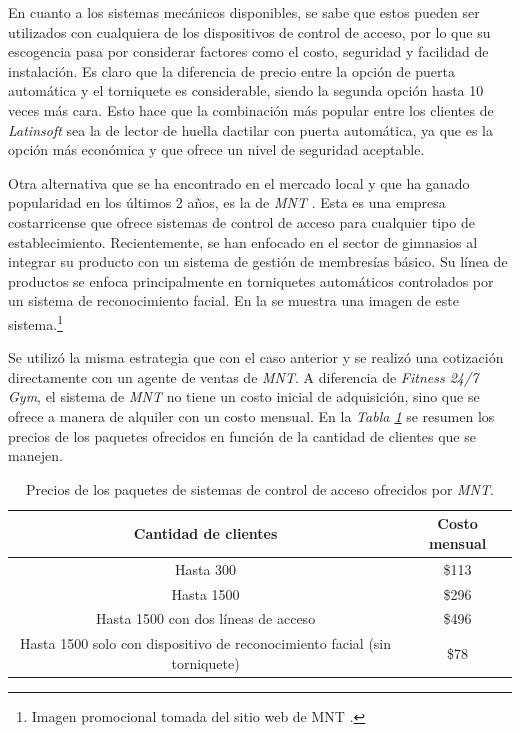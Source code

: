 En cuanto a los sistemas mecánicos disponibles, se sabe que estos pueden ser utilizados con cualquiera de los dispositivos de control de acceso, por lo que su escogencia pasa por considerar factores como el costo, seguridad y facilidad de instalación. Es claro que la diferencia de precio entre la opción de puerta automática y el torniquete es considerable, siendo la segunda opción hasta 10 veces más cara. Esto hace que la combinación más popular entre los clientes de \textit{Latinsoft} sea la de lector de huella dactilar con puerta automática, ya que es la opción más económica y que ofrece un nivel de seguridad aceptable.

Otra alternativa que se ha encontrado en el mercado local y que ha ganado popularidad en los últimos 2 años, es la de \textit{MNT} \cite{mnt}
. Esta es una empresa costarricense que ofrece sistemas de control de acceso para cualquier tipo de establecimiento. Recientemente, se han enfocado en el sector de gimnasios al integrar su producto con un sistema de gestión de membresías básico. Su línea de productos se enfoca principalmente en torniquetes automáticos controlados por un sistema de reconocimiento facial. En la  se muestra una imagen de este sistema.\footnote{Imagen promocional tomada del sitio web de MNT \cite{mnt}.}

Se utilizó la misma estrategia que con el caso anterior y se realizó una cotización directamente con un agente de ventas de \textit{MNT}. A diferencia de \textit{Fitness 24/7 Gym}, el sistema de \textit{MNT} no tiene un costo inicial de adquisición, sino que se ofrece a manera de alquiler con un costo mensual. En la \textit{Tabla \ref{tab:mnt_prices}} se resumen los precios de los paquetes ofrecidos en función de la cantidad de clientes que se manejen.

\begin{table}[h!]
    \centering
    \begin{tabular}{c|c}
    \hline
         \textbf{Cantidad de clientes} & \textbf{Costo mensual}\\
         \hline
         Hasta 300 & \$113\\
         Hasta 1500 & \$296\\
         Hasta 1500 con dos líneas de acceso & \$496\\
         Hasta 1500 solo con dispositivo de reconocimiento facial (sin torniquete) & \$78\\
         \hline
    \end{tabular}
    \captionsetup{justification=centering}
    \caption{Precios de los paquetes de sistemas de control de acceso ofrecidos por \textit{MNT}.}
    \label{tab:mnt_prices}
\end{table}

